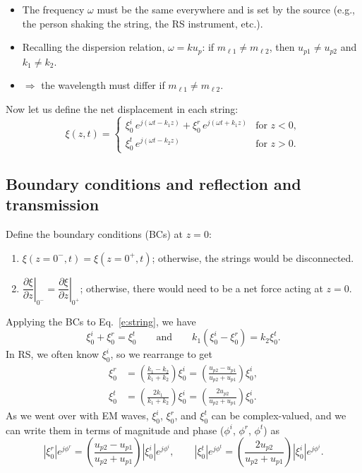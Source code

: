 \documentclass[11pt, oneside]{article}
\begin{document}
\begin{itemize}
	\item The frequency $\omega$ must be the same everywhere and is set by the source (e.g., the person shaking the string, the RS instrument, etc.).
	\item Recalling the dispersion relation, $\omega = k u_p$: if $m_{\ell 1} \ne m_{\ell 2}$, then $u_{p1} \ne u_{p2}$ and $k_1 \ne k_2$.
	\item[] $\Rightarrow$ the wavelength must differ if $m_{\ell 1} \ne m_{\ell 2}$.
\end{itemize}

Now let us define the net displacement in each string:
\begin{equation}
	\label{e:string}
	\xi(z,t) =
	\begin{cases}
		\xi_0^i\,e^{j(\omega t - k_1 z)} + \xi_0^r\,e^{j(\omega t + k_1 z)} & \text{for } z<0,\\[4pt]
		\xi_0^t\,e^{j(\omega t - k_2 z)} & \text{for } z>0.
	\end{cases}
\end{equation}

\subsection{Boundary conditions and reflection and transmission}

Define the boundary conditions (BCs) at $z = 0$:
\begin{enumerate}
	\item $\xi(z=0^-,t) = \xi(z=0^+,t)$; otherwise, the strings would be disconnected.
	\item $\left.\dfrac{\partial \xi}{\partial z}\right|_{0^-} = \left.\dfrac{\partial \xi}{\partial z}\right|_{0^+}$; otherwise, there would need to be a net force acting at $z = 0$.
\end{enumerate}
Applying the BCs to Eq.~\eqref{e:string}, we have
\begin{equation}
	\xi_0^i + \xi_0^r = \xi_0^t
	\qquad \text{and} \qquad
	k_1(\xi_0^i - \xi_0^r) = k_2 \xi_0^t.
\end{equation}
In RS, we often know $\xi_0^i$, so we rearrange to get
\begin{align}
	\xi_0^r &= \left(\frac{k_1 - k_2}{k_1 + k_2}\right)\xi_0^i = \left(\frac{u_{p2} - u_{p1}}{u_{p2} + u_{p1}}\right)\xi_0^i, \\
	\xi_0^t &= \left(\frac{2k_1}{k_1 + k_2}\right)\xi_0^i = \left(\frac{2u_{p2}}{u_{p2} + u_{p1}}\right)\xi_0^i.
\end{align}
As we went over with EM waves, $\xi_0^i$, $\xi_0^r$, and $\xi_0^t$ can be complex-valued, and we can write them in terms of magnitude and phase ($\phi^i$, $\phi^r$, $\phi^t$) as
\begin{equation}
	\label{e:string_phase}
	|\xi_0^r|e^{j\phi^r} = \left(\frac{u_{p2} - u_{p1}}{u_{p2} + u_{p1}}\right)|\xi_0^i|e^{j\phi^i},
	\qquad
	|\xi_0^t|e^{j\phi^t} = \left(\frac{2u_{p2}}{u_{p2} + u_{p1}}\right)|\xi_0^i|e^{j\phi^i}.
\end{equation}
\end{document}
